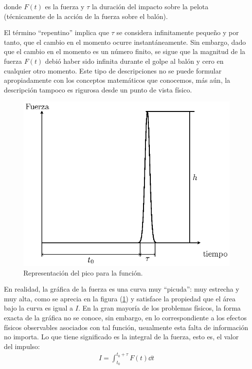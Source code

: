 donde $F(t)$ es la fuerza y $\tau$ la duración del impacto sobre la pelota (técnicamente de la acción de la fuerza sobre el balón).
\par
El término \enquote{repentino} implica que $\tau$ se considera infinitamente pequeño y por tanto, que el cambio en el momento ocurre instantáneamente. Sin embargo, dado que el cambio en el momento es un número finito, se sigue que la magnitud de la fuerza $F(t)$ debió haber sido infinita durante el golpe al balón y cero en cualquier otro momento. Este
tipo de descripciones no se puede formular apropiadamente con los conceptos matemáticos que conocemos, más aún, la descripción tampoco es rigurosa desde un punto de vista físico.
\begin{figure}[H]
    \centering
    \includegraphics[scale=1]{Imagenes/delta_Dirac_01.eps}
    \caption{Representación del pico para la función.}
    \label{fig:figura_delta_Dirac_01}
\end{figure}

En realidad, la gráfica de la fuerza es una curva muy \enquote{picuda}: muy estrecha y muy alta, como se aprecia en la figura (\ref{fig:figura_delta_Dirac_01}) y satisface la propiedad que el área bajo la curva es igual a $I$. En la gran mayoría de los problemas físicos, la forma exacta de la gráfica no se conoce, sin embargo, en lo correspondiente a los efectos físicos observables asociados con tal función, usualmente esta falta de información no importa. Lo que tiene significado es la integral de la fuerza, esto es, el valor del impulso:
\begin{align*}
I = \int_{t_{0}}^{t_{0} + \tau } F(t) \dd{t}
\end{align*}

